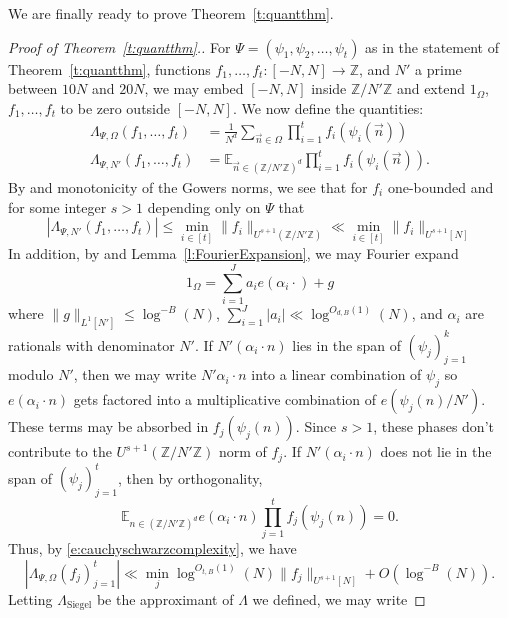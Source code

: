 \documentclass[11pt, a4paper]{amsart}
\theoremstyle{plain}
\theoremstyle{plain}
\theoremstyle{definition}
\theoremstyle{remark}
\numberwithin{equation}{section}
\numberwithin{lemma}{section}
\numberwithin{proposition}{section}
\numberwithin{corollary}{section}
\numberwithin{definition}{section}
\numberwithin{claim}{section}
\begin{document}
We are finally ready to prove Theorem~\ref{t:quantthm}.
\begin{proof}[Proof of Theorem~\ref{t:quantthm}.]
For $\Psi = (\psi_1, \psi_2, \dots, \psi_t)$ as in the statement of Theorem~\ref{t:quantthm}, functions $f_1, \dots, f_t\colon [-N, N] \to \mathbb{Z}$, and $N'$ a prime between $10N$ and $20N$, we may embed $[-N, N]$ inside $\mathbb{Z}/N'\mathbb{Z}$ and extend $1_{\Omega}$, $f_1, \dots, f_t$ to be zero outside $[-N, N]$. We now define the quantities:
\begin{align*}
\Lambda_{\Psi, \Omega}(f_1, \dots, f_t) &= \frac{1}{N^d}\sum_{\vec{n} \in \Omega} \prod_{i = 1}^t f_i(\psi_i(\vec{n}))  \\
\Lambda_{\Psi, N'}(f_1, \dots, f_t) &= \mathbb{E}_{\vec{n} \in (\mathbb{Z}/N'\mathbb{Z})^d } \prod_{i = 1}^t f_i(\psi_i(\vec{n})).
\end{align*}
By \cite[Exercise 1.3.23]{Tao12} and monotonicity of the Gowers norms, we see that for $f_i$ one-bounded and for some integer $s > 1$ depending only on $\Psi$ that
\begin{equation}\label{e:cauchyschwarzcomplexity}
 |\Lambda_{\Psi, N'}(f_1, \dots, f_t)| \le \min_{i \in [t]} \|f_i\|_{U^{s + 1}(\mathbb{Z}/N'\mathbb{Z})} \ll \min_{i \in [t]} \|f_i\|_{U^{s + 1}[N]}   
\end{equation}
In addition, by \cite[Corollary A.3]{GT10} and Lemma~\ref{l:FourierExpansion}, we may Fourier expand
$$1_\Omega = \sum_{i = 1}^J a_i e(\alpha_i \cdot ) + g$$
where $\|g\|_{L^1[N']} \le \log^{-B}(N)$, $\sum_{i = 1}^J |a_i| \ll \log^{O_{d, B}(1)}(N)$, and $\alpha_i$ are rationals with denominator $N'$. If $N'(\alpha_i \cdot n)$ lies in the span of $(\psi_j)_{j = 1}^k$ modulo $N'$, then we may write $N' \alpha_i \cdot n$ into a linear combination of $\psi_j$ so $e(\alpha_i \cdot n)$ gets factored into a multiplicative combination of $e(\psi_j(n)/N')$. These terms may be absorbed in $f_j(\psi_j(n))$. Since $s > 1$, these phases don't contribute to the $U^{s + 1}(\mathbb{Z}/N'\mathbb{Z})$ norm of $f_j$. If $N'(\alpha_i \cdot n)$ does not lie in the span of $(\psi_j)_{j = 1}^t$, then by orthogonality,
$$\mathbb{E}_{n \in (\mathbb{Z}/N'\mathbb{Z})^d} e(\alpha_i \cdot n) \prod_{j = 1}^t f_j(\psi_j(n)) = 0.$$
Thus, by \eqref{e:cauchyschwarzcomplexity}, we have
\begin{equation}\label{e:gowersbound}
|\Lambda_{\Psi, \Omega} (f_j)_{j = 1}^t| \ll \min_{j} \log^{O_{t, B}(1)}(N)\|f_j\|_{U^{s + 1}[N]} + O(\log^{-B}(N)).
\end{equation}
Letting $\Lambda_{\mathrm{Siegel}}$ be the approximant of $\Lambda$ we defined, we may write

\end{proof}
\end{document}
